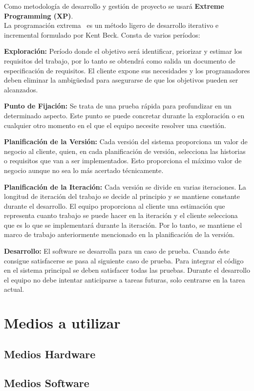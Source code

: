 Como metodología de desarrollo y gestión de proyecto se usará \textbf{Extreme Programming (XP)}.\\
La programación extrema~\cite{Newk02} es un método ligero de desarrollo iterativo e incremental formulado por Kent Beck. Consta de varios períodos:
\begin{description}
	\item  \textbf{Exploración:}
	Período donde el objetivo será identificar, priorizar y estimar los requisitos del trabajo, por lo tanto se obtendrá como salida un documento de especificación de requisitos. El cliente expone sus necesidades y los programadores deben eliminar la ambigüedad para asegurarse de que los objetivos pueden ser alcanzados.

	\item \textbf{Punto de Fijación:}
	Se trata de una prueba rápida para profundizar en un determinado aspecto. Este punto se puede concretar durante la exploración o en cualquier otro momento en el que el equipo necesite resolver una cuestión.

	\item \textbf{Planificación de la Versión:}
	Cada versión del sistema proporciona un valor de negocio al cliente, quien, en cada planificación de versión, selecciona las historias o requisitos que van a ser implementados. Esto proporciona el máximo valor de negocio aunque no sea lo más acertado técnicamente.

	\item \textbf{Planificación de la Iteración:}
	Cada versión se divide en varias iteraciones. La longitud de iteración del trabajo se decide al principio y se mantiene constante durante el desarrollo. El equipo proporciona al cliente una estimación que representa cuanto trabajo se puede hacer en la iteración y el cliente selecciona que es lo que se implementará durante la iteración. Por lo tanto, se mantiene el marco de trabajo anteriormente mencionado en la planificación de la versión.

	\item \textbf{Desarrollo:}
	El software se desarrolla para un caso de prueba. Cuando éste consigue satisfacerse se pasa al siguiente caso de prueba. Para integrar el código en el sistema principal se deben satisfacer todas las pruebas. Durante el desarrollo el equipo no debe intentar anticiparse a tareas futuras, solo centrarse en la tarea actual.

\end{description}

\section{Medios a utilizar}
\subsection{Medios Hardware}
\subsection{Medios Software}
